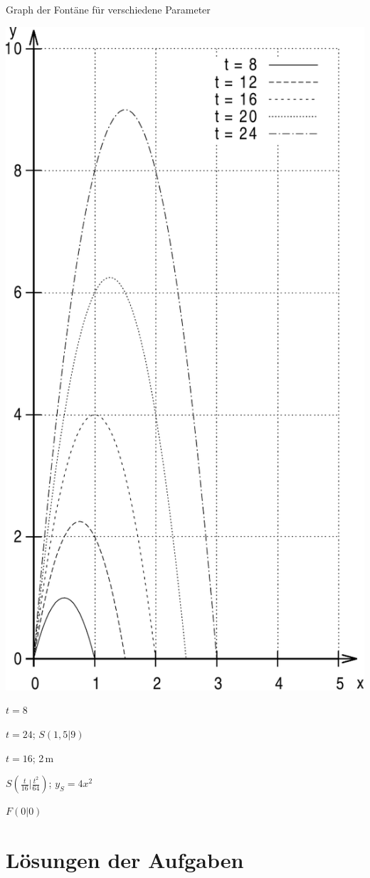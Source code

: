 \documentclass[11pt,a4paper,twoside,fleqn]{article}
\begin{document}
\begin{solution}
  \begin{enumerate}
    \begin{minipage}[t]{0.4\linewidth}
    \item
      Graph der Fontäne für verschiedene Parameter

      \includegraphics[width=\linewidth]{pics/graph_4_1}
    \end{minipage}
    \hfill
\setcounter{enumi}{2}
\begin{minipage}[t]{0.5\linewidth}
\item $t=8$
\item $t=24$; $S(1,5|9)$
\item $t=16$; 2\,m
\item $S(\frac t {16}| \frac {t^2} {64})$;\; $y_S=4x^2$
\item $F(0|0)$
\end{minipage}
\end{enumerate}
\end{solution}

\newpage
\section{Lösungen der Aufgaben}
{\scriptsize\printsolutions}
\end{document}
